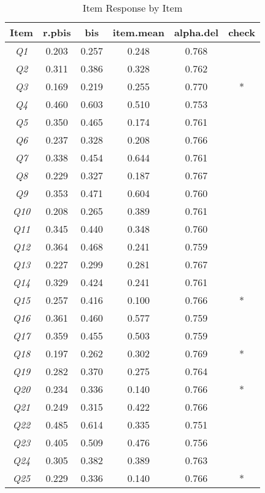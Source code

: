 \begin{table}[h]
\centering
\begin{tabular}{cccccc}
\toprule
Item & r.pbis & bis & item.mean & alpha.del & check \\
\midrule
\textit{Q1} & 0.203 & 0.257 & 0.248 & 0.768 &  \\
\textit{Q2} & 0.311 & 0.386 & 0.328 & 0.762 &  \\
\textit{Q3} & 0.169 & 0.219 & 0.255 & 0.770 & * \\
\textit{Q4} & 0.460 & 0.603 & 0.510 & 0.753 &  \\
\textit{Q5} & 0.350 & 0.465 & 0.174 & 0.761 &  \\
\textit{Q6} & 0.237 & 0.328 & 0.208 & 0.766 &  \\
\textit{Q7} & 0.338 & 0.454 & 0.644 & 0.761 &  \\
\textit{Q8} & 0.229 & 0.327 & 0.187 & 0.767 &  \\
\textit{Q9} & 0.353 & 0.471 & 0.604 & 0.760 &  \\
\textit{Q10} & 0.208 & 0.265 & 0.389 & 0.761 &  \\
\textit{Q11} & 0.345 & 0.440 & 0.348 & 0.760 &  \\
\textit{Q12} & 0.364 & 0.468 & 0.241 & 0.759 &  \\
\textit{Q13} & 0.227 & 0.299 & 0.281 & 0.767 &  \\
\textit{Q14} & 0.329 & 0.424 & 0.241 & 0.761 &  \\
\textit{Q15} & 0.257 & 0.416 & 0.100 & 0.766 & * \\
\textit{Q16} & 0.361 & 0.460 & 0.577 & 0.759 &  \\
\textit{Q17} & 0.359 & 0.455 & 0.503 & 0.759 &  \\
\textit{Q18} & 0.197 & 0.262 & 0.302 & 0.769 & * \\
\textit{Q19} & 0.282 & 0.370 & 0.275 & 0.764 &  \\
\textit{Q20} & 0.234 & 0.336 & 0.140 & 0.766 & * \\
\textit{Q21} & 0.249 & 0.315 & 0.422 & 0.766 &  \\
\textit{Q22} & 0.485 & 0.614 & 0.335 & 0.751 &  \\
\textit{Q23} & 0.405 & 0.509 & 0.476 & 0.756 &  \\
\textit{Q24} & 0.305 & 0.382 & 0.389 & 0.763 &  \\
\textit{Q25} & 0.229 & 0.336 & 0.140 & 0.766 & * \\
\bottomrule
\end{tabular}
\caption{Item Response by Item}
\label{tab:item_response}
\end{table}
